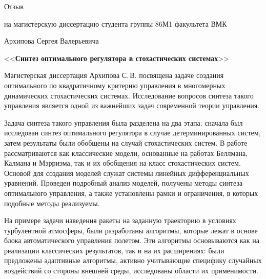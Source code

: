 \documentclass[12pt,a4paper,legalpaper,pdftex]{letter}
\begin{document}
\newcommand{\underscore}[1]{\underline{\hspace*{#1cm}}}
\newcommand{\dateline}{<<\underscore{0.7}>>~\underscore{2.5}~2011 г.}

\newcommand{\header}[1]{\begin{center}{\fontsize{20.74pt}{10pt}\selectfont #1}\end{center}}
\newcommand{\subheader}[1]{\begin{center}{\fontsize{14pt}{12pt}\selectfont\center #1}\end{center}}
\newcommand{\wtitle}[1]{\begin{center}{\fontsize{17.28pt}{14pt}\selectfont <<\textbf{#1}>>}\end{center}}



\pagestyle{empty}


\header{Отзыв}
\subheader{на магистерскую диссертацию студента группы 86М1 факультета ВМК}
\subheader{Архипова Сергея Валерьевича}

\wtitle{Синтез оптимального регулятора в стохастических системах}

Магистерская диссертация Архипова С.\,В. посвящена задаче создания оптимального по квадратичному критерию управления в многомерных динамических стохастических системах. Исследование вопросов синтеза такого управления является одной из важнейших задач современной теории управления.

Задача синтеза такого управления была разделена на два этапа: сначала был исследован синтез оптимального регулятора в случае детерминированных систем, затем результаты были обобщены на случай стохастических систем. В работе рассматриваются как классические модели, основанные на работах Беллмана, Калмана и Мэрриэма, так и их обобщения на класс стохастических систем. Основой для создания моделей служат системы линейных дифференциальных уравнений. Проведен подробный анализ моделей, получены методы синтеза оптимального управления, а также установлены рамки и ограничения, в которых подобные методы реализуемы.

На примере задачи наведения ракеты на заданную траекторию в условиях турбулентной атмосферы, были разработаны алгоритмы, которые лежат в основе блока автоматического управления полетом. Эти алгоритмы основываются как на реализации классических результатов, так и на их расширениях: были предложены адаптивные алгоритмы, активно учитывающие специфику случайных воздействий со стороны внешней среды, исследованы области их применимости.
\end{document}
